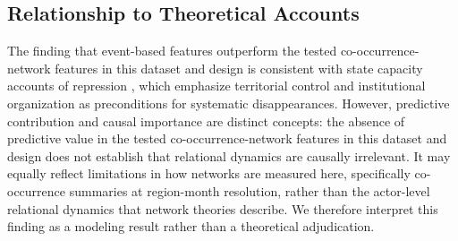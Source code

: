 \documentclass[pdflatex,sn-mathphys-num]{sn-jnl}%
\theoremstyle{thmstyleone}%
\theoremstyle{thmstyletwo}%
\theoremstyle{thmstylethree}%
\begin{document}



\subsection{Relationship to Theoretical Accounts}

The finding that event-based features outperform the tested co-occurrence-network features in this dataset and design is consistent with state capacity accounts of repression \cite{tilly1985war,davenport2007state,mann2005dark}, which emphasize territorial control and institutional organization as preconditions for systematic disappearances. However, predictive contribution and causal importance are distinct concepts: the absence of predictive value in the tested co-occurrence-network features in this dataset and design does not establish that relational dynamics are causally irrelevant. It may equally reflect limitations in how networks are measured here, specifically co-occurrence summaries at region-month resolution, rather than the actor-level relational dynamics that network theories describe. We therefore interpret this finding as a modeling result rather than a theoretical adjudication.
\end{document}
